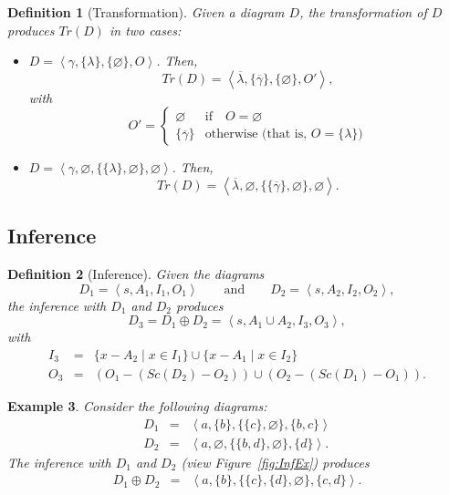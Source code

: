 \documentclass{article}
\newtheorem{definition}{Definition}
\newtheorem{example}[definition]{Example}
\begin{document}
\begin{definition}[Transformation]
Given a diagram $D$, the \emph{transformation} of $D$ produces $Tr(D)$ in two cases:
\begin{itemize}
    \item $D = \left< \gamma, \{\lambda\}, \{\varnothing\}, O\right>$. Then,
    \[
    Tr(D) = 
    \left<
    \overline{\lambda}, \{\overline{\gamma}\},
    \{\varnothing\}, O'
    \right>,
    \]
    with 
    \[
    O' = \left\{
    \begin{array}{ll}
        \varnothing & \text{if}\quad O = \varnothing \\
        \{\overline{\gamma}\} & \text{otherwise (that is, $O=\{\lambda\}$)} 
    \end{array}\right.
    \]
    \item $D = \left< \gamma, \varnothing, \{\{\lambda\},\varnothing\}, \varnothing\right>$. Then,
    \[
    Tr(D) = 
    \left<
    \overline{\lambda}, \varnothing,
    \{\{\overline{\gamma}\},\varnothing\}, \varnothing\right>.
    \]
\end{itemize}
\end{definition}

\subsection{Inference}

\begin{definition}[Inference]
Given the diagrams
\[D_1 = \left< s, A_1, I_1, O_1\right>\quad\quad
\text{and}\quad\quad
D_2 = \left< s, A_2, I_2, O_2\right>,
\]
the inference with $D_1$ and $D_2$ produces
\[D_3 = D_1 \oplus D_2 = \left< s, A_1 \cup A_2, I_3, O_3
\right>,\]
with 
\begin{eqnarray*}
I_3 & = & 
\{x-A_2 \mid x\in I_1\} \cup
\{x-A_1 \mid x\in I_2\} \\
O_3 & = &  
\left(O_1 - \left(Sc\left(D_2\right)-O_2\right) \right) \cup
\left(O_2 - \left(Sc\left(D_1\right)-O_1\right) \right).
\end{eqnarray*}


\end{definition}

\begin{example}
\label{exInf}
Consider the following diagrams: 
\begin{eqnarray*}
D_1 & = & \left<a, \{b\}, \{\{c\},\varnothing\}, \{b,c\}    \right>\\
D_2 & = & \left<a, \varnothing, \{\{b,d\},\varnothing\}, \{d\}    \right>.
\end{eqnarray*}
The inference with $D_1$ and $D_2$ (view Figure~\ref{fig:InfEx}) produces
\begin{eqnarray*}
D_1\oplus D_2 & = & \left<a, \{b\}, \{\{c\},\{d\},\varnothing\}, \{c,d\}\right>.
\end{eqnarray*}
\end{example}
\end{document}
